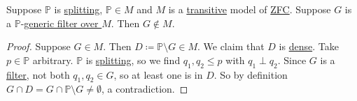 \documentclass{article}
\newcommand{\named}[1]{\textbf{#1}\index{#1}}
\newcommand{\1}{\mathbbm{1}}
\begin{document}
\begin{lemma}
  Suppose $\mathbb{P}$ is \hyperlink{def:splitting}{splitting}, $\mathbb{P} \in M$ and $M$ is a \hyperlink{def:transitive}{transitive} model of \hyperlink{def:axioms}{\textsf{ZFC}}.
  Suppose $G$ is a $\mathbb{P}$-\hyperlink{def:genericO}{generic filter over $M$}. Then $G \notin M$.
\end{lemma}
\begin{proof}
  Suppose $G \in M$. Then $D \coloneqq \mathbb{P} \setminus G \in M$. We claim that $D$ is \hyperlink{def:dense}{dense}.
  Take $p \in \mathbb{P}$ arbitrary. $\mathbb{P}$ is \hyperlink{def:splitting}{splitting}, so we find $q_1,q_2 \leq p$ with $q_1 \perp q_2$.
  Since $G$ is a \hyperlink{def:filter}{filter}, not both $q_1, q_2 \in G$, so at least one is in $D$.
  So by definition $G \cap D = G \cap \mathbb{P} \setminus G \neq \emptyset$, a contradiction.
\end{proof}

\printindex
\end{document}
